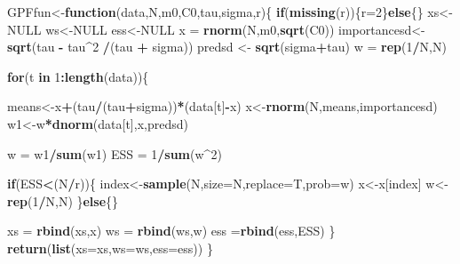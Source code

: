 \documentclass[
]{book}
\newenvironment{Shaded}{\begin{snugshade}}{\end{snugshade}}
\newcommand{\ControlFlowTok}[1]{\textcolor[rgb]{0.13,0.29,0.53}{\textbf{#1}}}
\newcommand{\DataTypeTok}[1]{\textcolor[rgb]{0.13,0.29,0.53}{#1}}
\newcommand{\DecValTok}[1]{\textcolor[rgb]{0.00,0.00,0.81}{#1}}
\newcommand{\KeywordTok}[1]{\textcolor[rgb]{0.13,0.29,0.53}{\textbf{#1}}}
\newcommand{\NormalTok}[1]{#1}
\newcommand{\OperatorTok}[1]{\textcolor[rgb]{0.81,0.36,0.00}{\textbf{#1}}}
\newcommand{\OtherTok}[1]{\textcolor[rgb]{0.56,0.35,0.01}{#1}}
\newcommand{\StringTok}[1]{\textcolor[rgb]{0.31,0.60,0.02}{#1}}
\theoremstyle{break}
\theoremstyle{nonumberplain}
\begin{document}
\begin{Shaded}
\begin{Highlighting}[]
\NormalTok{GPFfun<-}\ControlFlowTok{function}\NormalTok{(data,N,m0,C0,tau,sigma,r)\{}
  \ControlFlowTok{if}\NormalTok{(}\KeywordTok{missing}\NormalTok{(r))\{r=}\DecValTok{2}\NormalTok{\}}\ControlFlowTok{else}\NormalTok{\{\}}
\NormalTok{  xs<-}\OtherTok{NULL}
\NormalTok{  ws<-}\OtherTok{NULL}
\NormalTok{  ess<-}\OtherTok{NULL}
\NormalTok{  x  =}\StringTok{ }\KeywordTok{rnorm}\NormalTok{(N,m0,}\KeywordTok{sqrt}\NormalTok{(C0))}
\NormalTok{  importancesd<-}\KeywordTok{sqrt}\NormalTok{(tau }\OperatorTok{-}\StringTok{ }\NormalTok{tau}\OperatorTok{^}\DecValTok{2} \OperatorTok{/}\NormalTok{(tau }\OperatorTok{+}\StringTok{ }\NormalTok{sigma))}
\NormalTok{  predsd <-}\StringTok{ }\KeywordTok{sqrt}\NormalTok{(sigma}\OperatorTok{+}\NormalTok{tau)}
\NormalTok{  w  =}\StringTok{ }\KeywordTok{rep}\NormalTok{(}\DecValTok{1}\OperatorTok{/}\NormalTok{N,N)}
  
  \ControlFlowTok{for}\NormalTok{(t }\ControlFlowTok{in} \DecValTok{1}\OperatorTok{:}\KeywordTok{length}\NormalTok{(data))\{}
    
\NormalTok{    means<-x}\OperatorTok{+}\NormalTok{(tau}\OperatorTok{/}\NormalTok{(tau}\OperatorTok{+}\NormalTok{sigma))}\OperatorTok{*}\NormalTok{(data[t]}\OperatorTok{-}\NormalTok{x)}
\NormalTok{    x<-}\KeywordTok{rnorm}\NormalTok{(N,means,importancesd)}
\NormalTok{    w1<-w}\OperatorTok{*}\KeywordTok{dnorm}\NormalTok{(data[t],x,predsd)}
    
\NormalTok{    w =}\StringTok{ }\NormalTok{w1}\OperatorTok{/}\KeywordTok{sum}\NormalTok{(w1)}
\NormalTok{    ESS  =}\StringTok{ }\DecValTok{1}\OperatorTok{/}\KeywordTok{sum}\NormalTok{(w}\OperatorTok{^}\DecValTok{2}\NormalTok{)}
    
    \ControlFlowTok{if}\NormalTok{(ESS}\OperatorTok{<}\NormalTok{(N}\OperatorTok{/}\NormalTok{r))\{}
\NormalTok{      index<-}\KeywordTok{sample}\NormalTok{(N,}\DataTypeTok{size=}\NormalTok{N,}\DataTypeTok{replace=}\NormalTok{T,}\DataTypeTok{prob=}\NormalTok{w)}
\NormalTok{      x<-x[index]}
\NormalTok{      w<-}\KeywordTok{rep}\NormalTok{(}\DecValTok{1}\OperatorTok{/}\NormalTok{N,N)}
\NormalTok{    \}}\ControlFlowTok{else}\NormalTok{\{\}}
    
\NormalTok{    xs =}\StringTok{ }\KeywordTok{rbind}\NormalTok{(xs,x)}
\NormalTok{    ws =}\StringTok{ }\KeywordTok{rbind}\NormalTok{(ws,w)}
\NormalTok{    ess =}\KeywordTok{rbind}\NormalTok{(ess,ESS)}
\NormalTok{  \}}
  \KeywordTok{return}\NormalTok{(}\KeywordTok{list}\NormalTok{(}\DataTypeTok{xs=}\NormalTok{xs,}\DataTypeTok{ws=}\NormalTok{ws,}\DataTypeTok{ess=}\NormalTok{ess))}
\NormalTok{\}}
\end{Highlighting}
\end{Shaded}
\end{document}
